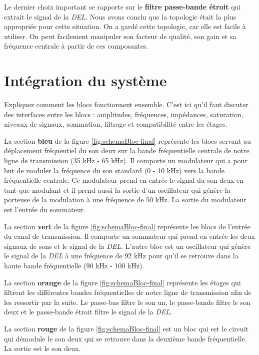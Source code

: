 \documentclass[11pt,letterpaper]{article}
\begin{document}
Le dernier choix important se rapporte sur le \textbf{filtre passe-bande étroit} qui extrait le signal de la \textit{DEL}. Nous avons conclu que la topologie  était la plus appropriée pour cette situation. On a gardé cette topologie, car elle est facile à utiliser. On peut facilement manipuler son facteur de qualité, son gain et sa fréquence centrale à partir de ces composantes.

\clearpage
\section{Intégration du système}
Expliquez comment les blocs fonctionnent ensemble. C'est ici qu'il faut discuter des interfaces entre les blocs : amplitudes, fréquences, impédances, saturation, niveaux de signaux, sommation, filtrage et compatibilité entre les étages.

La section \textbf{bleu} de la figure \ref{fig:schemaBloc-final} représente les blocs servant au déplacement fréquentiel du son deux sur la bande fréquentielle centrale de notre ligne de transmission (35 kHz - 65 kHz). Il comporte un modulateur qui a pour but de moduler la fréquence du son standard (0 - 10 kHz) vers la bande fréquentielle centrale. Ce modulateur prend en entrée le signal du son deux en tant que modulant et il prend aussi la sortie d'un oscillateur qui génère la porteuse de la modulation à une fréquence de 50 kHz. La sortie du modulateur est l'entrée du sommateur.

La section \textbf{vert} de la figure \ref{fig:schemaBloc-final} représente les blocs de l'entrée du canal de transmission. Il comporte un sommateur qui prend en entrée les deux signaux de sons et le signal de la \textit{DEL}. L'autre bloc est un oscillateur qui génère le signal de la \textit{DEL} à une fréquence de 92 kHz pour qu'il se retrouve dans la haute bande fréquentielle (90 kHz - 100 kHz).

La section \textbf{orange} de la figure \ref{fig:schemaBloc-final} représente les étages qui filtrent les différentes bandes fréquentielles de notre ligne de transmission afin de les ressortir par la suite. Le passe-bas filtre le son un, le passe-bande filtre le son deux et le passe-bande étroit filtre le signal de la \textit{DEL}.

La section \textbf{rouge} de la figure \ref{fig:schemaBloc-final} est un bloc qui est le circuit qui démodule le son deux qui se retrouve dans la deuxième bande fréquentielle. La sortie est le son deux.
\end{document}
